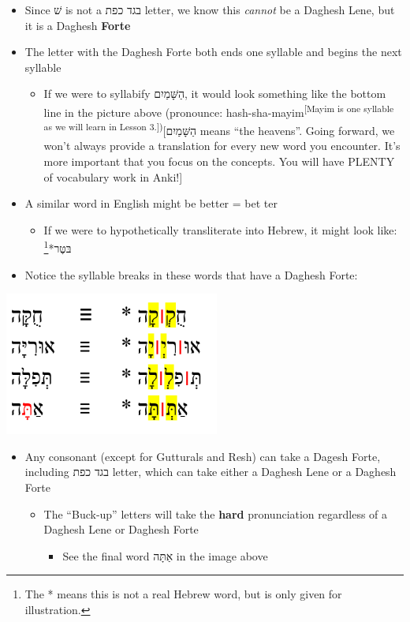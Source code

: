 \documentclass[
]{turabian-researchpaper}
\providecommand{\tightlist}{%
  \setlength{\itemsep}{0pt}\setlength{\parskip}{0pt}}
\begin{document}
\begin{itemize}
\tightlist
\item
  Since שׁ is not a בגד כפת letter, we know this \emph{cannot} be a Daghesh Lene, but it is a Daghesh \textbf{Forte}
\item
  The letter with the Daghesh Forte both ends one syllable and begins the next syllable

  \begin{itemize}
  \tightlist
  \item
    If we were to syllabify הַשָּׁמַיִם, it would look something like the bottom line in the picture above (pronounce: hash-sha-mayim\textsuperscript{{[}Mayim is one syllable as we will learn in Lesson 3.{]})}{[}הַשָּׁמַיִם means ``the heavens''. Going forward, we won't always provide a translation for every new word you encounter. It's more important that you focus on the concepts. You will have PLENTY of vocabulary work in Anki!{]}
  \end{itemize}
\item
  A similar word in English might be better = bet \textbar{} ter

  \begin{itemize}
  \tightlist
  \item
    If we were to hypothetically transliterate into Hebrew, it might look like: בּטֶּר*\footnote{The * means this is not a real Hebrew word, but is only given for illustration.}
  \end{itemize}
\item
  Notice the syllable breaks in these words that have a Daghesh Forte:
\end{itemize}

\begin{center}\includegraphics[width=200pt]{images/02.forte} \end{center}

\begin{itemize}
\tightlist
\item
  Any consonant (except for Gutturals and Resh) can take a Dagesh Forte, including בגד כפת letter, which can take either a Daghesh Lene or a Daghesh Forte

  \begin{itemize}
  \tightlist
  \item
    The ``Buck-up'' letters will take the \textbf{hard} pronunciation regardless of a Daghesh Lene or Daghesh Forte

    \begin{itemize}
    \tightlist
    \item
      See the final word אַתָּה in the image above
    \end{itemize}
  \end{itemize}
\end{itemize}
\end{document}
